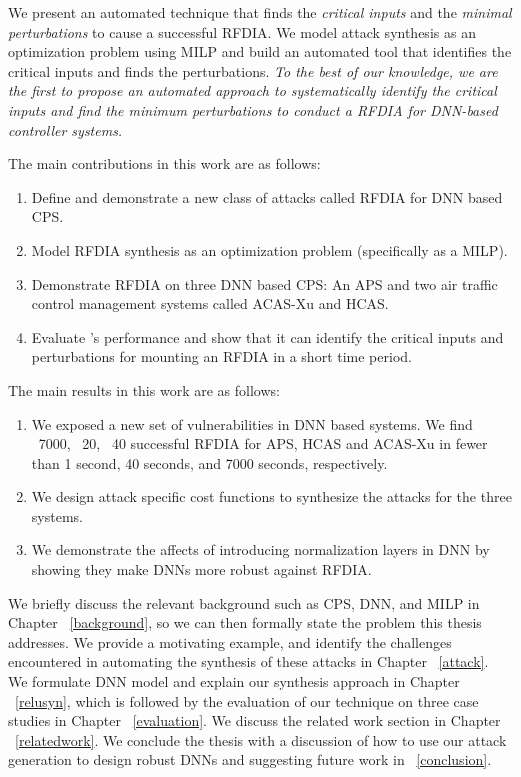 We present an automated technique that finds the \textit{critical inputs} and the \textit{minimal perturbations} to cause a successful \ac{RFDIA}. 
We model attack synthesis as an optimization problem using \ac{MILP} and build an automated tool \tool that identifies the critical inputs and finds the perturbations.
{\em To the best of our knowledge, we are the first to  propose an automated approach to systematically identify the critical inputs and find the minimum perturbations to conduct a \ac{RFDIA} for DNN-based controller systems.}

The main contributions in this work are as follows:

\begin{enumerate}
	\item Define and demonstrate a new class of attacks called \ac{RFDIA} for \ac{DNN} based \ac{CPS}. 
	\item Model \ac{RFDIA} synthesis as an optimization problem (specifically as a \ac{MILP}). 
	\item Demonstrate \ac{RFDIA} on three \ac{DNN} based \ac{CPS}:  An \ac{APS} and two air traffic control management systems called \ac{ACAS-Xu} and \ac{HCAS}.
	\item Evaluate \tool's performance and show that it can identify the critical inputs and perturbations for mounting an \ac{RFDIA} in a short time period.  
\end{enumerate}

The main results in this work are as follows:

\begin{enumerate}
	\item We exposed a new set of vulnerabilities in \ac{DNN} based systems. 
	 We find ~7000, ~20, ~40 successful \ac{RFDIA} for \ac{APS}, \ac{HCAS} and \ac{ACAS-Xu} in fewer than 1 second, 40 seconds, and 7000 seconds, respectively. 
	\item We design attack specific cost functions to synthesize the attacks for the three systems.
	\item We demonstrate the affects of introducing normalization layers in \ac{DNN} by showing they make \ac{DNN}s more robust against \ac{RFDIA}. 
\end{enumerate}

	
We briefly discuss the relevant background such as \ac{CPS}, \ac{DNN}, and \ac{MILP} in Chapter ~\ref{background}, so we can then formally state the problem this thesis addresses. 
We provide a motivating example, and identify the challenges encountered in automating the synthesis of these attacks in Chapter ~\ref{attack}.
We formulate \ac{DNN} model and explain our synthesis approach in Chapter ~\ref{relusyn}, which is followed by the evaluation of our technique on three case studies in Chapter ~\ref{evaluation}.
We discuss the related work section in Chapter ~\ref{relatedwork}.
We conclude the thesis with a discussion of how to use our attack generation to design robust \ac{DNN}s and suggesting future work in ~\ref{conclusion}.










